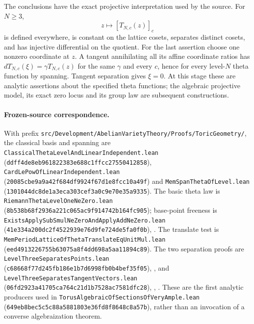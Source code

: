 The conclusions have the exact projective interpretation
used by the source.  For \(N\ge3\),
\[
        z\longmapsto[T_{N,c}(z)]_c
\]
is defined everywhere, is constant on the lattice cosets,
separates distinct cosets, and has injective differential
on the quotient.
For the last assertion choose one nonzero coordinate at
\(z\).  A tangent annihilating all its affine coordinate
ratios has \(dT_{N,c}(\xi)=\gamma T_{N,c}(z)\) for the same
\(\gamma\) and every \(c\), hence for every level-\(N\)
theta function by spanning.  Tangent separation gives
\(\xi=0\).
At this stage these are analytic assertions about the
specified theta functions; the algebraic projective model,
its exact zero locus and its group law are subsequent
constructions.

\paragraph{Frozen-source correspondence.}
With prefix
\texttt{src/Development/AbelianVarietyTheory/Proofs/ToricGeometry/},
the classical basis and spanning are
\texttt{ClassicalThetaLevelAndLinearIndependent.lean}
(\texttt{ddff4de8eb961822383e688c1ffcc27550412858}),
\texttt{CardLePowOfLinearIndependent.lean}
(\texttt{20085cbe9a9a42f684df9924f67d1e8fcc10a49f})
and \texttt{MemSpanThetaOfLevel.lean}
(\texttt{1301044dc8de1a3eca303cef3a0c9e70e35a9335}).
The basic theta law is
\texttt{RiemannThetaLevelOneNeZero.lean}
(\texttt{8b538b68f2936a221c065ac9f914742b164fc905});
base-point freeness is
\texttt{ExistsApplySubSmulNeZeroAndApplyAddNeZero.lean}
(\texttt{41e334a200dc2f4522939e76d9fe724de5fa0f0b}),
.
The translate test is
\texttt{MemPeriodLatticeOfThetaTranslateEqUnitMul.lean}
(\texttt{eed4913226755b63075a8f4dd698a5aa11894c89}).
The two separation proofs are
\texttt{LevelThreeSeparatesPoints.lean}
(\texttt{c68668f77d245fb186e1b7d6998fb0b4bef35f05}),
, and
\texttt{LevelThreeSeparatesTangentVectors.lean}
(\texttt{06fd2923a41705ca764c21d1b7528ac7581dfc28}),
,
.
These are the first analytic producers used in
\texttt{TorusAlgebraicOfSectionsOfVeryAmple.lean}
(\texttt{649eb8bec5c5c88a5881803e36fd8f8648c8a57b}),
rather than an invocation of a converse algebraization
theorem.
